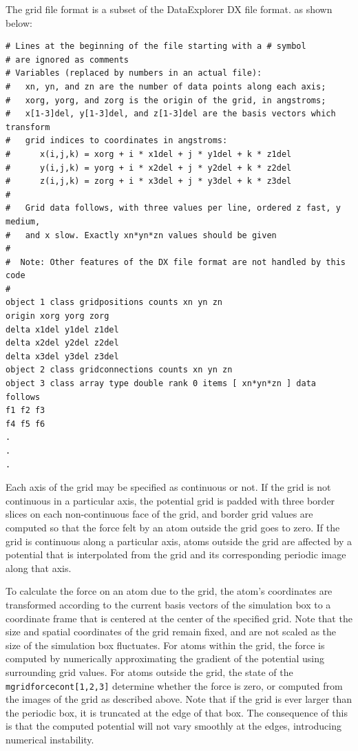 The grid file format is a subset of the DataExplorer DX file format. as shown below:
\begin{verbatim}
# Lines at the beginning of the file starting with a # symbol 
# are ignored as comments
# Variables (replaced by numbers in an actual file):
#   xn, yn, and zn are the number of data points along each axis;
#   xorg, yorg, and zorg is the origin of the grid, in angstroms;
#   x[1-3]del, y[1-3]del, and z[1-3]del are the basis vectors which transform
#   grid indices to coordinates in angstroms:
#      x(i,j,k) = xorg + i * x1del + j * y1del + k * z1del
#      y(i,j,k) = yorg + i * x2del + j * y2del + k * z2del
#      z(i,j,k) = zorg + i * x3del + j * y3del + k * z3del
#
#   Grid data follows, with three values per line, ordered z fast, y medium,
#   and x slow. Exactly xn*yn*zn values should be given
#   
#  Note: Other features of the DX file format are not handled by this code
#
object 1 class gridpositions counts xn yn zn
origin xorg yorg zorg
delta x1del y1del z1del
delta x2del y2del z2del
delta x3del y3del z3del
object 2 class gridconnections counts xn yn zn
object 3 class array type double rank 0 items [ xn*yn*zn ] data follows
f1 f2 f3
f4 f5 f6
.
.
.
\end{verbatim}

Each axis of the grid may be specified as continuous or not. If the grid is not continuous in a particular axis, the potential grid is padded with three border slices on each non-continuous face of the grid, and border grid values are computed so that the force felt by an atom outside the grid goes to zero. If the grid is continuous along a particular axis, atoms outside the grid are affected by a potential that is interpolated from the grid and its corresponding periodic image along that axis.

To calculate the force on an atom due to the grid, the atom's coordinates are transformed according to the current basis vectors of the simulation box to a coordinate frame that is centered at the center of the specified grid. Note that the size and spatial coordinates of the grid remain fixed, and are not scaled as the size of the simulation box fluctuates. For atoms within the grid, the force is computed by numerically approximating the gradient of the potential using surrounding grid values. For atoms outside the grid, the state of the {\tt mgridforcecont[1,2,3]} determine whether the force is zero, or computed from the images of the grid as described above. Note that if the grid is ever larger than the periodic box, it is truncated at the edge of that box. The consequence of this is that the computed potential will not vary smoothly at the edges, introducing numerical instability.

